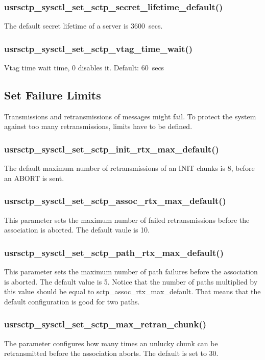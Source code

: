 \documentclass[a4paper]{article}
\begin{document}
\subsubsection{usrsctp\_sysctl\_set\_sctp\_secret\_lifetime\_default()}
The default secret lifetime of a server is 3600~secs.

\subsubsection{usrsctp\_sysctl\_set\_sctp\_vtag\_time\_wait()}
Vtag time wait time, 0 disables it. Default: 60~secs


\subsection{Set Failure Limits}
Transmissions and retransmissions of messages might fail. To protect the system against too many
retransmissions, limits have to be defined.

\subsubsection{usrsctp\_sysctl\_set\_sctp\_init\_rtx\_max\_default()}
The default maximum number of retransmissions of an INIT chunks is 8, before an ABORT is sent.

\subsubsection{usrsctp\_sysctl\_set\_sctp\_assoc\_rtx\_max\_default()}
This parameter sets the maximum number of failed retransmissions before the association is aborted.
The default vaule is 10.

\subsubsection{usrsctp\_sysctl\_set\_sctp\_path\_rtx\_max\_default()}
This parameter sets the maximum number of path failures before the association is aborted.
The default value is 5. Notice that the number of paths multiplied by this value should be 
equal to sctp\_assoc\_rtx\_max\_default. That means that the default configuration is good for two 
paths.

\subsubsection{usrsctp\_sysctl\_set\_sctp\_max\_retran\_chunk()}
The parameter configures how many times an unlucky chunk can be retransmitted before the 
association aborts. The default is set to 30.
				
\end{document}
